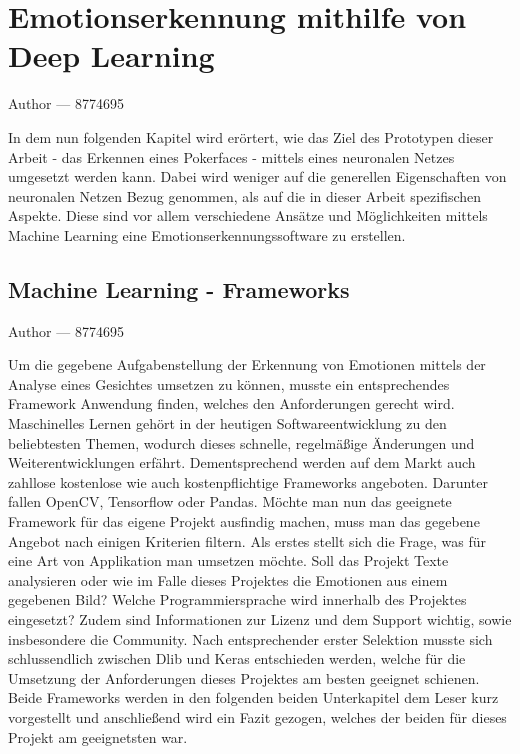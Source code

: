 \documentclass[12pt, a4paper]{report}
\makeatletter
\newcommand{\sectionauthor}[1]{%
  {\parindent0pt\vspace*{-5pt}%
  \large{Author --- }
  \linespread{1.1}\large\scshape#1%
  \par\nobreak\vspace*{35pt} }
  \@afterheading%
}
\makeatother
\begin{document}
\section{Emotionserkennung mithilfe von Deep Learning}
\sectionauthor{8774695}
In dem nun folgenden Kapitel wird erörtert, wie das Ziel des Prototypen dieser Arbeit - das Erkennen eines Pokerfaces - mittels eines neuronalen Netzes umgesetzt werden kann. Dabei wird weniger auf die generellen Eigenschaften von neuronalen Netzen Bezug genommen, als auf die in dieser Arbeit spezifischen Aspekte. Diese sind vor allem verschiedene Ansätze und Möglichkeiten mittels Machine Learning eine Emotionserkennungssoftware zu erstellen.

\subsection{Machine Learning - Frameworks}
\sectionauthor{8774695}
Um die gegebene Aufgabenstellung der Erkennung von Emotionen mittels der Analyse eines Gesichtes umsetzen zu können, musste ein entsprechendes Framework Anwendung finden, welches den Anforderungen gerecht wird. Maschinelles Lernen gehört in der heutigen Softwareentwicklung zu den beliebtesten Themen, wodurch dieses schnelle, regelmäßige Änderungen und Weiterentwicklungen erfährt. Dementsprechend werden auf dem Markt auch zahllose kostenlose wie auch kostenpflichtige Frameworks angeboten. Darunter fallen OpenCV, Tensorflow oder Pandas. Möchte man nun das geeignete Framework für das eigene Projekt ausfindig machen, muss man das gegebene Angebot nach einigen Kriterien filtern. Als erstes stellt sich die Frage, was für eine Art von Applikation man umsetzen möchte. Soll das Projekt Texte analysieren oder wie im Falle dieses Projektes die Emotionen aus einem gegebenen Bild? Welche Programmiersprache wird innerhalb des Projektes eingesetzt? Zudem sind Informationen zur Lizenz und dem Support wichtig, sowie insbesondere die Community.\newline
Nach entsprechender erster Selektion musste sich schlussendlich zwischen Dlib und Keras entschieden werden, welche für die Umsetzung der Anforderungen dieses Projektes am besten geeignet schienen. Beide Frameworks werden in den folgenden beiden Unterkapitel dem Leser kurz vorgestellt und anschließend wird ein Fazit gezogen, welches der beiden für dieses Projekt am geeignetsten war.
\end{document}
